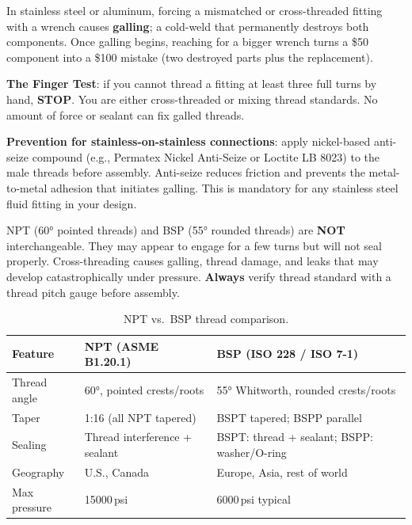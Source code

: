 \begin{warningbox}
In stainless steel or aluminum, forcing a mismatched or cross-threaded fitting with a wrench causes \textbf{galling}; a cold-weld that permanently destroys both components. Once galling begins, reaching for a bigger wrench turns a \$50 component into a \$100 mistake (two destroyed parts plus the replacement).

\textbf{The Finger Test}: if you cannot thread a fitting at least three full turns by hand, \textbf{STOP}. You are either cross-threaded or mixing thread standards. No amount of force or sealant can fix galled threads.

\textbf{Prevention for stainless-on-stainless connections}: apply nickel-based anti-seize compound (e.g., Permatex Nickel Anti-Seize or Loctite LB 8023) to the male threads before assembly. Anti-seize reduces friction and prevents the metal-to-metal adhesion that initiates galling. This is mandatory for any stainless steel fluid fitting in your design.
\end{warningbox}

\begin{warningbox}
NPT (\ang{60} pointed threads) and BSP (\ang{55} rounded threads) are \textbf{NOT} interchangeable. They may appear to engage for a few turns but will not seal properly. Cross-threading causes galling, thread damage, and leaks that may develop catastrophically under pressure. \textbf{Always} verify thread standard with a thread pitch gauge before assembly.
\end{warningbox}

\begin{table}[htbp]
\centering
\small
\begin{tabularx}{\textwidth}{l X X}
  \toprule
  \textbf{Feature} & \textbf{NPT (ASME B1.20.1)} & \textbf{BSP (ISO 228 / ISO 7-1)} \\
  \midrule
  Thread angle & \ang{60}, pointed crests/roots & \ang{55} Whitworth, rounded crests/roots \\
  Taper & 1:16 (all NPT tapered) & BSPT tapered; BSPP parallel \\
  Sealing & Thread interference + sealant & BSPT: thread + sealant; BSPP: washer/O-ring \\
  Geography & U.S., Canada & Europe, Asia, rest of world \\
  Max pressure & 15000\,psi & 6000\,psi typical \\
  \bottomrule
\end{tabularx}
\caption{NPT vs.\ BSP thread comparison.}
\end{table}

